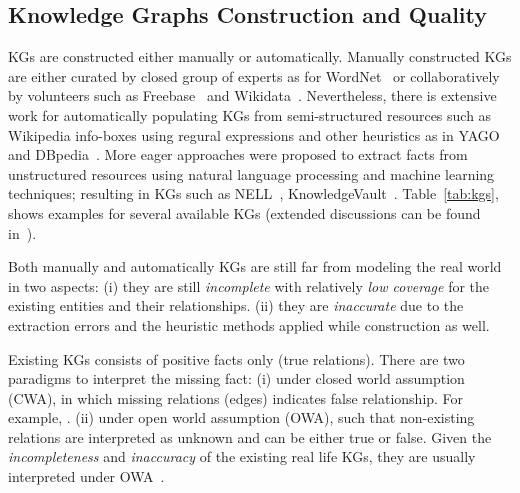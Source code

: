 
\subsection{Knowledge Graphs Construction and Quality}
KGs are constructed either manually or automatically. Manually constructed KGs are either curated by closed group of experts as for WordNet~\cite{wordnet} or collaboratively by volunteers such as \eg Freebase~\cite{Freebase} and Wikidata~\cite{wikidata}.  Nevertheless, there is extensive work for automatically populating KGs from semi-structured resources such as Wikipedia info-boxes using regural expressions and other heuristics as in YAGO~\cite{yago} and DBpedia~\cite{dbpedia}. More eager approaches were proposed to extract facts from unstructured resources using natural language processing and machine learning techniques; resulting in KGs such as  NELL~\cite{nell}, KnowledgeVault~\cite{KnowledgeVault}. Table~\ref{tab:kgs}, shows examples for several available KGs (extended discussions can be found in~\cite{Nickel2015ARO,DBLP:journals/semweb/Paulheim17}).


Both manually and automatically KGs are still far from modeling the real world in two aspects: (i) they are still \textit{incomplete} with relatively \textit{low coverage} for the existing entities and their relationships. (ii) they are \textit{inaccurate} due to the extraction errors and the heuristic methods applied while construction as well.  



 Existing KGs consists of positive facts only (\ie true relations). There are two paradigms to interpret the missing fact: (i) under closed world assumption (CWA), in which missing relations (\ie edges) indicates false relationship. For example, . (ii) under open world assumption (OWA), such that non-existing relations are interpreted as unknown and can be either true or false. Given the \textit{incompleteness} and \textit{inaccuracy} of the existing real life KGs, they are usually interpreted under OWA~\cite{Nickel2015ARO}. 
